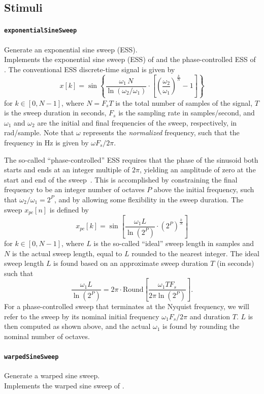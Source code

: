 \documentclass[11pt, oneside]{article}
\newcommand{\function}[1]{\paragraph*{\texttt{#1}}}
\begin{document}
\subsection{Stimuli}

\function{exponentialSineSweep} Generate an exponential sine sweep (ESS). \\
Implements the exponential sine sweep (ESS) of \citet{Farina2000} and the phase-controlled ESS of \citet{VetterdiRosario2011}.
The conventional ESS discrete-time signal is given by~\cite{Farina2000}
\begin{equation}
x[k] = \sin \left\{ \frac{\omega_1\,N}{\ln\left(\omega_2/\omega_1\right)} \cdot \left[\left(\frac{\omega_2}{\omega_1}\right)^{\frac{k}{N}}-1\right] \right\}
\end{equation}
for $k \in[0,N-1]$, where $N = F_s T$ is the total number of samples of the signal, $T$ is the sweep duration in seconds, $F_s$ is the sampling rate in samples/second, and $\omega_1$ and $\omega_2$ are the initial and final frequencies of the sweep, respectively, in rad/sample. Note that $\omega$ represents the \textit{normalized} frequency, such that the frequency in Hz is given by $\omega F_s/2 \pi$.

The so-called ``phase-controlled'' ESS requires that the phase of the sinusoid both starts and ends at an integer multiple of $2 \pi$, yielding an amplitude of zero at the start and end of the sweep~\cite{VetterdiRosario2011}. This is accomplished by constraining the final frequency to be an integer number of octaves $P$ above the initial frequency, such that $\omega_2/\omega_1=2^P$, and by allowing some flexibility in the sweep duration. The sweep $x_{pc}[n]$ is defined by~\cite{VetterdiRosario2011}
\begin{equation}
x_{pc}[k] = \sin \left[ \frac{ \omega_1 L}{\ln \left( 2^P \right)} \cdot \left( 2^P \right)^{\frac{k}{N}} \right]
\end{equation}
for $k \in[0,N-1]$, where $L$ is the so-called ``ideal'' sweep length in samples and $N$ is the actual sweep length, equal to $L$ rounded to the nearest integer. The ideal sweep length $L$ is found based on an approximate sweep duration $T$ (in seconds) such that 
\begin{equation}
\frac{\omega_1 L}{\ln \left( 2^P \right)} = 2 \pi \cdot \textrm{Round} \left[ \frac{\omega_1 T F_s}{2 \pi \ln \left( 2^P \right)} \right].
\end{equation}
For a phase-controlled sweep that terminates at the Nyquist frequency, we will refer to the sweep by its nominal initial frequency $\omega_1 F_s/2 \pi$ and duration $T$. $L$ is then computed as shown above, and the actual $\omega_1$ is found by rounding the nominal number of octaves.

\function{warpedSineSweep} Generate a warped sine sweep. \\
Implements the warped sine sweep of \citet{OchiaiKaneda2013}.



\end{document}
